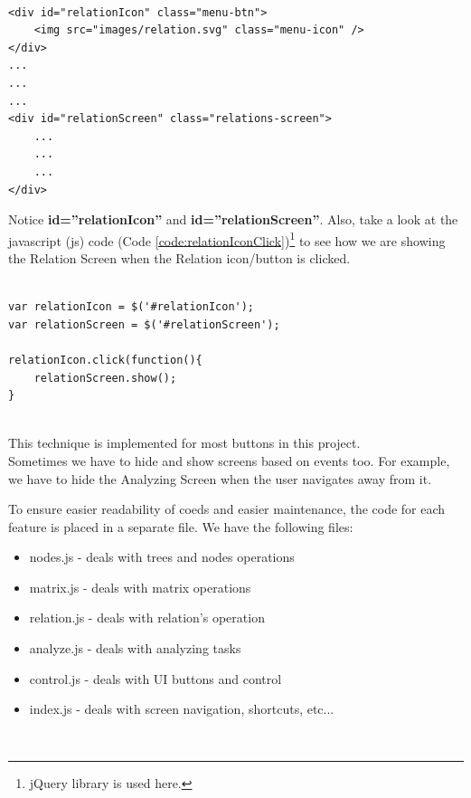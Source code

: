 \documentclass[11pt]{article} %
\begin{document}
\noindent
\begin{minipage}[c]{\linewidth}
\begin{lstlisting}[basicstyle=\scriptsize, tabsize=4, frame=single, caption= Relation Button html code, label=code:relationBtnHtml]

<div id="relationIcon" class="menu-btn">
	<img src="images/relation.svg" class="menu-icon" />
</div>
...
...
...
<div id="relationScreen" class="relations-screen">
	...
	...
	...
</div>
\end{lstlisting}
\end{minipage}
\noindent
Notice \textbf{id=''relationIcon''} and \textbf{id=''relationScreen''}. Also, take a look at the javascript (js) code (Code \ref{code:relationIconClick})\footnote{jQuery library is used here.} to see how we are showing the Relation Screen when the Relation icon/button is clicked.\\
\noindent
\begin{minipage}[c]{\linewidth}
\begin{lstlisting}[basicstyle=\scriptsize, tabsize=4, frame=single, caption= Relation Button html code, label=code:relationIconClick]

var relationIcon = $('#relationIcon');
var relationScreen = $('#relationScreen');

relationIcon.click(function(){
	relationScreen.show();
}
                    
\end{lstlisting}
\end{minipage}
\noindent
This technique is implemented for most buttons in this project.\\[12pt] \noindent
Sometimes we have to hide and show screens based on events too. For example, we have to hide the Analyzing Screen when the user navigates away from it.\\[6pt]

\begin{minipage}[c]{\linewidth}
To ensure easier readability of coeds and easier maintenance, the code for each feature is placed in a separate file. We have the following files:

\begin{itemize}
\item nodes.js - deals with trees and nodes operations
\item matrix.js - deals with matrix operations
\item relation.js - deals with relation's operation
\item analyze.js - deals with analyzing tasks
\item control.js - deals with UI buttons and control
\item index.js - deals with screen navigation, shortcuts, etc...
\end{itemize}
\end{minipage}
\\[12pt]
\end{document}
